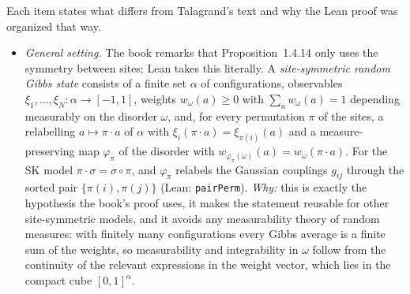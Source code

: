\begin{remark}\label{rem:sg-tal:dev-15}
Each item states what differs from Talagrand's text and why the Lean proof was organized that way.
\begin{itemize}
\item \emph{General setting.} The book remarks that Proposition~1.4.14 only uses the symmetry between sites; Lean takes this literally. A \emph{site-symmetric random Gibbs state} consists of a finite set $\alpha$ of configurations, observables $\xi_1,\dots,\xi_N:\alpha\to[-1,1]$, weights $w_\omega(a)\ge0$ with $\sum_a w_\omega(a)=1$ depending measurably on the disorder $\omega$, and, for every permutation $\pi$ of the sites, a relabelling $a\mapsto\pi\cdot a$ of $\alpha$ with $\xi_i(\pi\cdot a)=\xi_{\pi(i)}(a)$ and a measure-preserving map $\varphi_\pi$ of the disorder with $w_{\varphi_\pi(\omega)}(a)=w_\omega(\pi\cdot a)$. For the SK model $\pi\cdot\sigma=\sigma\circ\pi$, and $\varphi_\pi$ relabels the Gaussian couplings $g_{ij}$ through the sorted pair $\{\pi(i),\pi(j)\}$ (Lean: \texttt{pairPerm}).
\emph{Why:} this is exactly the hypothesis the book's proof uses, it makes the statement reusable for other site-symmetric models, and it avoids any measurability theory of random measures: with finitely many configurations every Gibbs average is a finite sum of the weights, so measurability and integrability in $\omega$ follow from the continuity of the relevant expressions in the weight vector, which lies in the compact cube $[0,1]^\alpha$.


\end{itemize}
\end{remark}

